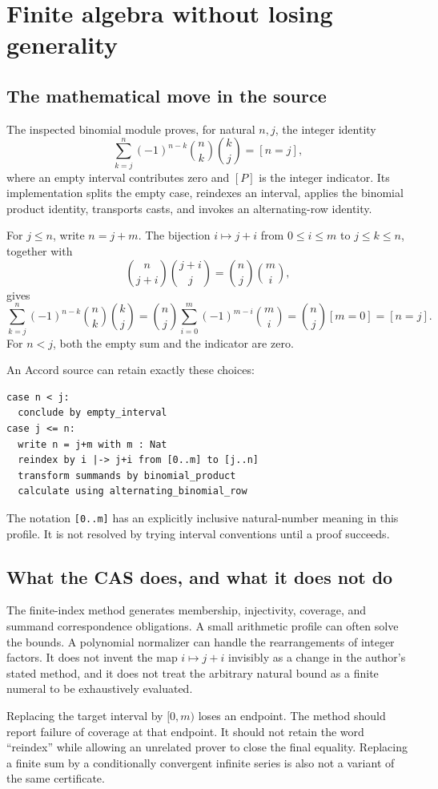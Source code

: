 \documentclass[11pt,letterpaper]{article}
\newcommand{\code}[1]{\nolinkurl{#1}}
\theoremstyle{definition}
\begin{document}
\section{Finite algebra without losing generality}\label{sec:binomial}
\subsection{The mathematical move in the source}
The inspected binomial module proves, for natural \(n,j\), the integer identity
\[
 \sum_{k=j}^{n}(-1)^{n-k}\binom nk\binom kj=[n=j],
\]
where an empty interval contributes zero and \([P]\) is the integer indicator.
Its implementation splits the empty case, reindexes an interval, applies the
binomial product identity, transports casts, and invokes an alternating-row
identity\cite{pbinomial}.

For \(j\le n\), write \(n=j+m\). The bijection \(i\mapsto j+i\) from
\(0\le i\le m\) to \(j\le k\le n\), together with
\[
 \binom n{j+i}\binom{j+i}j=\binom nj\binom mi,
\]
gives
\[
 \sum_{k=j}^{n}(-1)^{n-k}\binom nk\binom kj
 =\binom nj\sum_{i=0}^{m}(-1)^{m-i}\binom mi
 =\binom nj[m=0]=[n=j].
\]
For \(n<j\), both the empty sum and the indicator are zero.

An Accord source can retain exactly these choices:
\begin{lstlisting}
case n < j:
  conclude by empty_interval
case j <= n:
  write n = j+m with m : Nat
  reindex by i |-> j+i from [0..m] to [j..n]
  transform summands by binomial_product
  calculate using alternating_binomial_row
\end{lstlisting}
The notation \code{[0..m]} has an explicitly inclusive natural-number meaning in
this profile. It is not resolved by trying interval conventions until a proof
succeeds.

\subsection{What the CAS does, and what it does not do}
The finite-index method generates membership, injectivity, coverage, and summand
correspondence obligations. A small arithmetic profile can often solve the bounds.
A polynomial normalizer can handle the rearrangements of integer factors. It does
not invent the map \(i\mapsto j+i\) invisibly as a change in the author's stated
method, and it does not treat the arbitrary natural bound as a finite numeral to
be exhaustively evaluated.

Replacing the target interval by \([0,m)\) loses an endpoint. The method should
report failure of coverage at that endpoint. It should not retain the word
``reindex'' while allowing an unrelated prover to close the final equality.
Replacing a finite sum by a conditionally convergent infinite series is also not
a variant of the same certificate.
\end{document}
